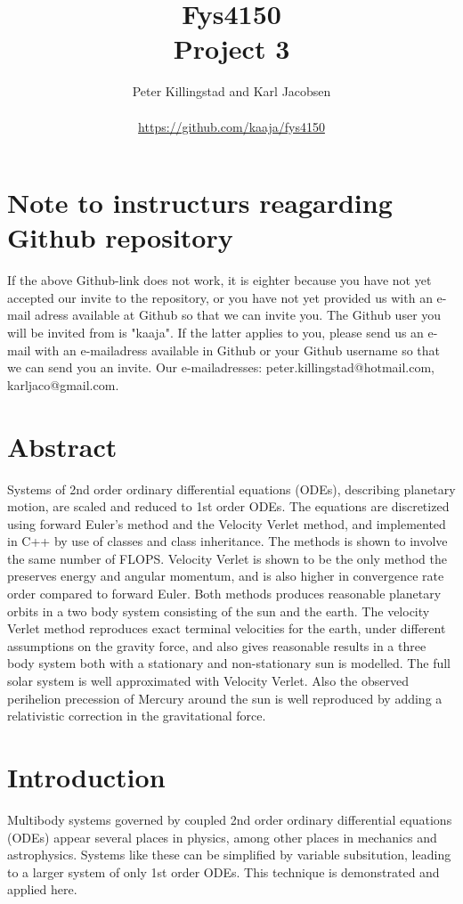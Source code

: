 \documentclass{article}
\title{Fys4150\\Project 3\\ }
\author{Peter Killingstad and Karl Jacobsen\\
\\
\url{https://github.com/kaaja/fys4150}}
\begin{document}
	
\maketitle



\section*{Note to instructurs reagarding Github repository}
If the above Github-link does not work, it is eighter because you have not yet accepted our invite to the repository, or you have not yet provided us with an e-mail adress available at Github so that we can invite you. The Github user you will be invited from is "kaaja". If the latter applies to you, please send us an e-mail with an e-mailadress available in Github or your Github username so that we can send you an invite. Our e-mailadresses: peter.killingstad@hotmail.com, karljaco@gmail.com.



\section*{Abstract}
Systems of 2nd order ordinary differential equations (ODEs), describing planetary motion, are scaled and reduced to 1st order ODEs. The equations are discretized using forward Euler's method and the Velocity Verlet method, and implemented in C++ by use of classes and class inheritance. The methods is shown to involve the same number of FLOPS. Velocity Verlet is shown to be the only method the preserves energy and angular momentum, and is also higher in convergence rate order compared to forward Euler. Both methods produces reasonable planetary orbits in a two body system consisting of the sun and the earth. The velocity Verlet method reproduces exact terminal velocities for the earth, under different assumptions on the gravity force, and also gives reasonable results in a three body system both with a stationary and non-stationary sun is modelled. The full solar system is well approximated with Velocity Verlet. Also the observed perihelion precession of Mercury around the sun is well reproduced by adding a relativistic correction in the gravitational force.


\section{Introduction}
Multibody systems governed by coupled 2nd order ordinary differential equations (ODEs) appear several places in physics, among other places in mechanics and astrophysics. Systems like these can be simplified by variable subsitution, leading to a larger system of only 1st order ODEs. This technique is demonstrated and applied here.\\
\end{document}
